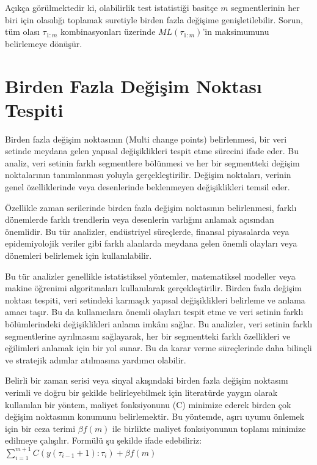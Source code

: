 \documentclass[12pt,twoside]{deuthesis}
\begin{document}
Açıkça görülmektedir ki, olabilirlik test istatistiği basitçe \(m\) segmentlerinin her biri için olasılığı toplamak suretiyle birden fazla değişime genişletilebilir. Sorun, tüm olası \(\tau_{1:m}\) kombinasyonları üzerinde \(ML(\tau_{1:m})\)'in maksimumunu belirlemeye dönüşür.

\hypertarget{birden-fazla-deux11fiux15fim-noktasux131-tespiti}{%
\section{Birden Fazla Değişim Noktası Tespiti}\label{birden-fazla-deux11fiux15fim-noktasux131-tespiti}}

Birden fazla değişim noktasının (Multi change points) belirlenmesi, bir veri setinde meydana gelen yapısal değişiklikleri tespit etme sürecini ifade eder. Bu analiz, veri setinin farklı segmentlere bölünmesi ve her bir segmentteki değişim noktalarının tanımlanması yoluyla gerçekleştirilir. Değişim noktaları, verinin genel özelliklerinde veya desenlerinde beklenmeyen değişiklikleri temsil eder.

Özellikle zaman serilerinde birden fazla değişim noktasının belirlenmesi, farklı dönemlerde farklı trendlerin veya desenlerin varlığını anlamak açısından önemlidir. Bu tür analizler, endüstriyel süreçlerde, finansal piyasalarda veya epidemiyolojik veriler gibi farklı alanlarda meydana gelen önemli olayları veya dönemleri belirlemek için kullanılabilir.

Bu tür analizler genellikle istatistiksel yöntemler, matematiksel modeller veya makine öğrenimi algoritmaları kullanılarak gerçekleştirilir. Birden fazla değişim noktası tespiti, veri setindeki karmaşık yapısal değişiklikleri belirleme ve anlama amacı taşır. Bu da kullanıcılara önemli olayları tespit etme ve veri setinin farklı bölümlerindeki değişiklikleri anlama imkânı sağlar. Bu analizler, veri setinin farklı segmentlerine ayrılmasını sağlayarak, her bir segmentteki farklı özellikleri ve eğilimleri anlamak için bir yol sunar. Bu da karar verme süreçlerinde daha bilinçli ve stratejik adımlar atılmasına yardımcı olabilir.

Belirli bir zaman serisi veya sinyal akışındaki birden fazla değişim noktasını verimli ve doğru bir şekilde belirleyebilmek için literatürde yaygın olarak kullanılan bir yöntem, maliyet fonksiyonunu (C) minimize ederek birden çok değişim noktasının konumunu belirlemektir. Bu yöntemde, aşırı uyumu önlemek için bir ceza terimi \(\beta f(m)\) ile birlikte maliyet fonksiyonunun toplamı minimize edilmeye çalışılır. Formülü şu şekilde ifade edebiliriz: \(\sum_{i=1}^{m+1} C(y(\tau_{i-1}+1):\tau_i) + \beta f(m)\)
\end{document}
